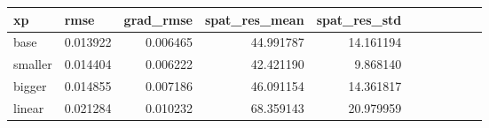 \begin{tabular}{llrrrrrrrrr}
\toprule
            xp &        rmse &   grad\_rmse &   spat\_res\_mean &  spat\_res\_std & \\
\midrule
   base &   0.013922 &    0.006465 &        44.991787 &     14.161194 &     \\
  smaller &   0.014404 &    0.006222 &        42.421190 &      9.868140 &     \\
  bigger &   0.014855 &    0.007186 &        46.091154 &     14.361817 &     \\
   linear &   0.021284 &    0.010232 &        68.359143 &     20.979959 &     \\
\bottomrule
\end{tabular}
